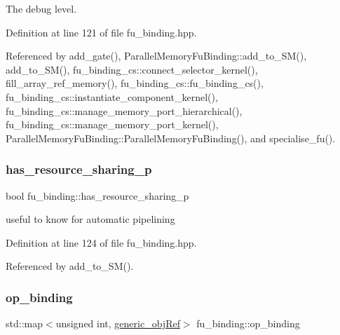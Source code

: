 The debug level. 



Definition at line 121 of file fu\+\_\+binding.\+hpp.



Referenced by add\+\_\+gate(), Parallel\+Memory\+Fu\+Binding\+::add\+\_\+to\+\_\+\+S\+M(), add\+\_\+to\+\_\+\+S\+M(), fu\+\_\+binding\+\_\+cs\+::connect\+\_\+selector\+\_\+kernel(), fill\+\_\+array\+\_\+ref\+\_\+memory(), fu\+\_\+binding\+\_\+cs\+::fu\+\_\+binding\+\_\+cs(), fu\+\_\+binding\+\_\+cs\+::instantiate\+\_\+component\+\_\+kernel(), fu\+\_\+binding\+\_\+cs\+::manage\+\_\+memory\+\_\+port\+\_\+hierarchical(), fu\+\_\+binding\+\_\+cs\+::manage\+\_\+memory\+\_\+port\+\_\+kernel(), Parallel\+Memory\+Fu\+Binding\+::\+Parallel\+Memory\+Fu\+Binding(), and specialise\+\_\+fu().

\mbox{\label{classfu__binding_a0803cef962aeb99cc0d822c4d076d25c}} 
\subsubsection{\texorpdfstring{has\+\_\+resource\+\_\+sharing\+\_\+p}{has\_resource\_sharing\_p}}
{\footnotesize\ttfamily bool fu\+\_\+binding\+::has\+\_\+resource\+\_\+sharing\+\_\+p\hspace{0.3cm}{\ttfamily [protected]}}



useful to know for automatic pipelining 



Definition at line 124 of file fu\+\_\+binding.\+hpp.



Referenced by add\+\_\+to\+\_\+\+S\+M().

\mbox{\label{classfu__binding_a102dbaa6c6b0e37763ac7f93a668a754}} 
\subsubsection{\texorpdfstring{op\+\_\+binding}{op\_binding}}
{\footnotesize\ttfamily std\+::map$<$unsigned int, \hyperlink{generic__obj_8hpp_acb533b2ef8e0fe72e09a04d20904ca81}{generic\+\_\+obj\+Ref}$>$ fu\+\_\+binding\+::op\+\_\+binding\hspace{0.3cm}{\ttfamily [protected]}}



